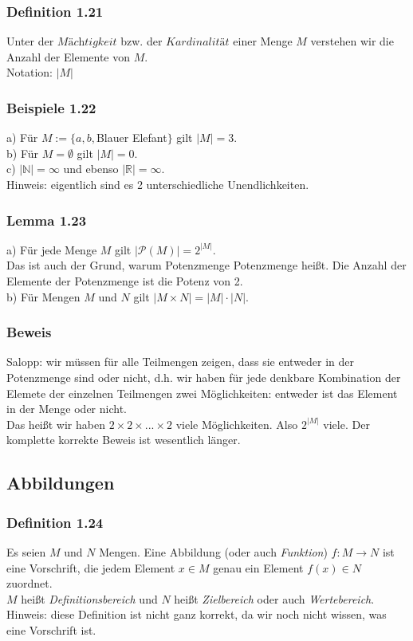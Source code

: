 \documentclass{article}
\begin{document}
\subsubsection*{Definition 1.21}
Unter der $\textit{Mächtigkeit}$ bzw. der $\textit{Kardinalität}$ einer Menge $M$ verstehen wir die Anzahl der Elemente von $M$. \\
Notation: $|M|$ 

\subsubsection*{Beispiele 1.22}
a) Für $M := \{a, b, $Blauer Elefant$\}$ gilt $|M| = 3$. \\
b) Für $M = \emptyset$ gilt $|M| = 0$. \\
c) $|\mathbb{N}| = \infty$ und ebenso $|\mathbb{R}| = \infty$. \\
Hinweis: eigentlich sind es 2 unterschiedliche Unendlichkeiten. 

\subsubsection*{Lemma 1.23}
a) Für jede Menge $M$ gilt $|\mathcal{P}(M)| = 2^{|M|}$. \\
Das ist auch der Grund, warum Potenzmenge Potenzmenge heißt. Die Anzahl der Elemente der Potenzmenge ist die Potenz von 2. \\
b) Für Mengen $M$ und $N$ gilt $|M \times N| = |M| \cdot |N|$. 

\subsubsection*{Beweis}
Salopp: wir müssen für alle Teilmengen zeigen, dass sie entweder in der Potenzmenge sind oder nicht, d.h. wir haben für jede denkbare Kombination der Elemete der einzelnen Teilmengen zwei Möglichkeiten: entweder ist das Element in der Menge oder nicht. \\
Das heißt wir haben $2 \times 2 \times ... \times 2$ viele Möglichkeiten. Also $2^{|M|}$ viele. Der komplette korrekte Beweis ist wesentlich länger.

\subsection{Abbildungen}
\subsubsection*{Definition 1.24}
Es seien $M$ und $N$ Mengen. Eine Abbildung (oder auch \textit{Funktion}) $f: M \rightarrow N$ ist eine Vorschrift, die jedem Element $x \in M$ genau ein Element $f(x) \in N$ zuordnet. \\
$M$ heißt \textit{Definitionsbereich} und $N$ heißt \textit{Zielbereich} oder auch \textit{Wertebereich}. \\
Hinweis: diese Definition ist nicht ganz korrekt, da wir noch nicht wissen, was eine Vorschrift ist.
\end{document}
